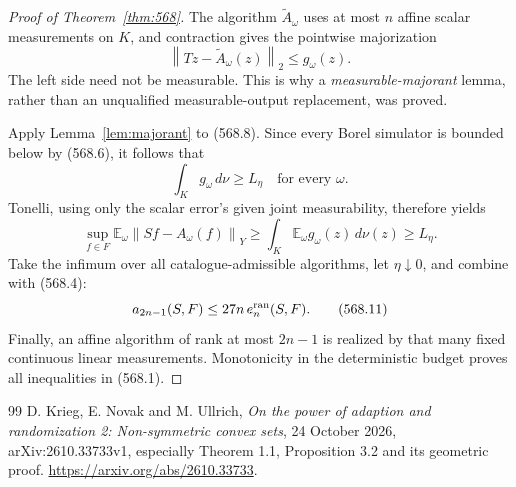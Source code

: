\documentclass[11pt,a4paper]{article}
\newcommand{\E}{\mathbb E}
\newcommand{\norm}[1]{\left\lVert#1\right\rVert}
\theoremstyle{definition}
\theoremstyle{remark}
\numberwithin{equation}{section}
\begin{document}
\begin{proof}[Proof of Theorem~\ref{thm:568}]
The algorithm \(\widetilde A_\omega\) uses at most \(n\) affine
scalar measurements on \(K\), and contraction gives the pointwise
majorization
\[
               \norm{Tz-\widetilde A_\omega(z)}_2
                              \le g_\omega(z).
 \tag{568.8}
\]
The left side need not be measurable. This is why a
\emph{measurable-majorant} lemma, rather than an unqualified
measurable-output replacement, was proved.

Apply Lemma~\ref{lem:majorant} to (568.8). Since every Borel simulator
is bounded below by (568.6), it follows that
\[
                         \int_K g_\omega\,d\nu\ge L_\eta
                          \quad\text{for every }\omega.
 \tag{568.9}
\]
Tonelli, using only the scalar error's given joint measurability,
therefore yields
\[
 \sup_{f\in F}\E_\omega\norm{Sf-A_\omega(f)}_Y
       \ge \int_K\E_\omega g_\omega(z)\,d\nu(z)
       \ge L_\eta .
 \tag{568.10}
\]
Take the infimum over all catalogue-admissible algorithms, let
\(\eta\downarrow0\), and combine with (568.4):
\[
       a_{2n-1}(S,F)\le27n\,e_n^{\rm ran}(S,F).
 \tag{568.11}
\]
Finally, an affine algorithm of rank at most \(2n-1\) is realized
by that many fixed continuous linear measurements. Monotonicity
in the deterministic budget proves all inequalities in (568.1).
\end{proof}


\begin{thebibliography}{99}
D. Krieg, E. Novak and M. Ullrich, \emph{On the power of adaption and randomization 2: Non-symmetric convex sets}, 24 October 2026, arXiv:2610.33733v1, especially Theorem 1.1, Proposition 3.2 and its geometric proof. \url{https://arxiv.org/abs/2610.33733}.
\end{thebibliography}
\end{document}
